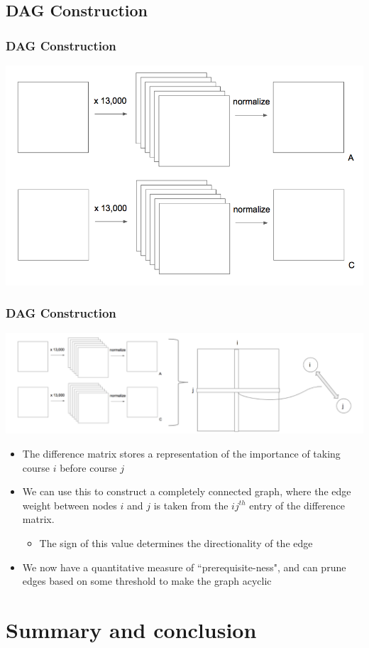 \documentclass{beamer}
\begin{document}
\subsection{DAG Construction}
\begin{frame}
     \frametitle{DAG Construction}
\centerline{\includegraphics[width=0.76\columnwidth]{a_c.png}}
\end{frame}

\begin{frame}
     \frametitle{DAG Construction}
\centerline{\includegraphics[width=1\columnwidth]{graph_construction.png}}
\begin{itemize}
\item The difference matrix stores a representation of the importance of taking course $i$ before course $j$
\item We can use this to construct a completely connected graph, where the edge weight between nodes $i$ and $j$ is taken from the $ij^{th}$ entry of the difference matrix.
\begin{itemize}
\item The sign of this value determines the directionality of the edge
\end{itemize}
\item We now have a quantitative measure of ``prerequisite-ness", and can prune edges based on some threshold to make the graph acyclic
\end{itemize}
\end{frame}

\section{Summary and conclusion}  \label{sec:conclusion}
\end{document}
